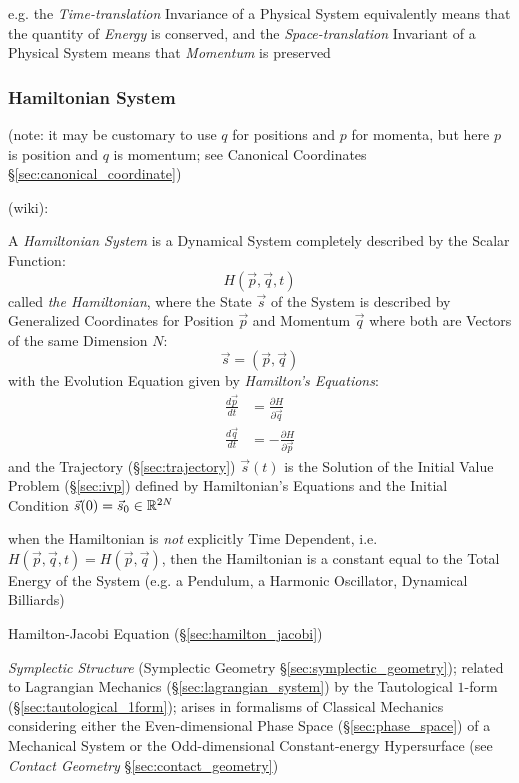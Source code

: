 e.g. the \emph{Time-translation} Invariance of a Physical System equivalently
means that the quantity of \emph{Energy} is conserved, and the
\emph{Space-translation} Invariant of a Physical System means that
\emph{Momentum} is preserved



\subsubsection{Hamiltonian System}\label{sec:hamiltonian_system}

(note: it may be customary to use $q$ for positions and $p$ for momenta, but
here $p$ is position and $q$ is momentum; see Canonical Coordinates
\S\ref{sec:canonical_coordinate})

(wiki):

A \emph{Hamiltonian System} is a Dynamical System completely described by the
Scalar Function:
\[
  H(\vec{p},\vec{q},t)
\]
called \emph{the Hamiltonian}, where the State $\vec{s}$ of the System is
described by Generalized Coordinates for Position $\vec{p}$ and Momentum
$\vec{q}$ where both are Vectors of the same Dimension $N$:
\[
  \vec{s} = (\vec{p},\vec{q})
\]
with the Evolution Equation given by \emph{Hamilton's Equations}:
\begin{align*}
  \frac{d\vec{p}}{dt} & = \frac{\partial{H}}{\partial{\vec{q}}} \\
  \frac{d\vec{q}}{dt} & = -\frac{\partial{H}}{\partial{\vec{p}}}
\end{align*}
and the Trajectory (\S\ref{sec:trajectory}) $\vec{s}(t)$ is the Solution of
the Initial Value Problem (\S\ref{sec:ivp}) defined by Hamiltonian's Equations
and the Initial Condition $\vec{s}(0) = \vec{s}_0 \in \mathbb{R}^{2N}$

when the Hamiltonian is \emph{not} explicitly Time Dependent, i.e.
$H(\vec{p},\vec{q},t) = H(\vec{p},\vec{q})$, then the Hamiltonian is a
constant equal to the Total Energy of the System (e.g. a Pendulum, a Harmonic
Oscillator, Dynamical Billiards)

\fist Hamilton-Jacobi Equation (\S\ref{sec:hamilton_jacobi})

\emph{Symplectic Structure} (Symplectic Geometry
\S\ref{sec:symplectic_geometry}); related to Lagrangian Mechanics
(\S\ref{sec:lagrangian_system}) by the Tautological $1$-form
(\S\ref{sec:tautological_1form}); arises in formalisms of Classical Mechanics
considering either the Even-dimensional Phase Space (\S\ref{sec:phase_space})
of a Mechanical System or the Odd-dimensional Constant-energy Hypersurface (see
\emph{Contact Geometry} \S\ref{sec:contact_geometry})


